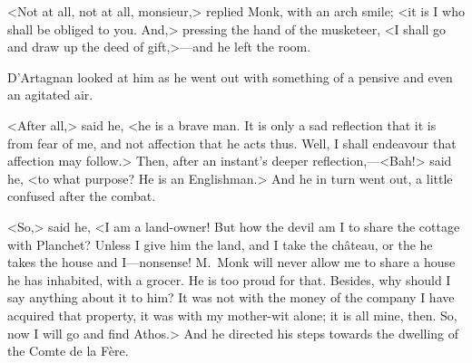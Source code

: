 <Not at all, not at all, monsieur,> replied Monk, with an arch smile; <it is I who shall be obliged to you. And,> pressing the hand of the musketeer, <I shall go and draw up the deed of gift,>—and he left the room.

D'Artagnan looked at him as he went out with something of a pensive and even an agitated air.

<After all,> said he, <he is a brave man. It is only a sad reflection that it is from fear of me, and not affection that he acts thus. Well, I shall endeavour that affection may follow.> Then, after an instant's deeper reflection,—<Bah!> said he, <to what purpose? He is an Englishman.> And he in turn went out, a little confused after the combat.

<So,> said he, <I am a land-owner! But how the devil am I to share the cottage with Planchet? Unless I give him the land, and I take the château, or the he takes the house and I—nonsense! M.~Monk will never allow me to share a house he has inhabited, with a grocer. He is too proud for that. Besides, why should I say anything about it to him? It was not with the money of the company I have acquired that property, it was with my mother-wit alone; it is all mine, then. So, now I will go and find Athos.> And he directed his steps towards the dwelling of the Comte de la Fère. 
